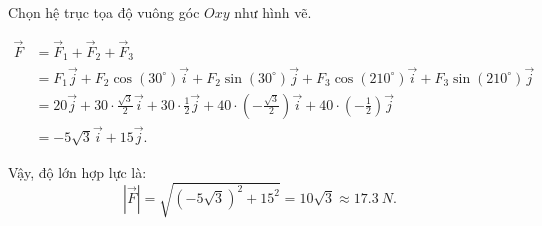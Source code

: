 Chọn hệ trục tọa độ vuông góc $Oxy$ như hình vẽ.

\begin{align*}
   \vec{F} &= \vec{F}_1 + \vec{F}_2 + \vec{F}_3 \\
   &= F_1 \vec{j} + F_2 \cos(30^\circ) \vec{i} + F_2 \sin(30^\circ) \vec{j} + F_3 \cos(210^\circ) \vec{i} + F_3 \sin(210^\circ) \vec{j} \\
   &= 20 \vec{j} + 30 \cdot \frac{\sqrt{3}}{2} \vec{i} + 30 \cdot \frac{1}{2} \vec{j} + 40 \cdot \left(-\frac{\sqrt{3}}{2}\right) \vec{i} + 40 \cdot \left(-\frac{1}{2}\right) \vec{j} \\
   &= -5\sqrt{3} \vec{i} + 15 \vec{j}.
\end{align*}

Vậy, độ lớn hợp lực là:
\begin{equation*}
   \left|\vec{F}\right| = \sqrt{(-5\sqrt{3})^2 + 15^2} = 10\sqrt{3} \approx \boxed{\qty{17.3}{N}}.
\end{equation*}